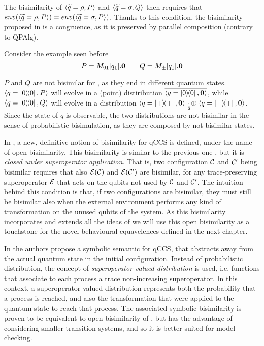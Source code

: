 The bisimilarity of $\langle\widetilde{q} = \rho, P\rangle $ and $\langle\widetilde{q} = 	\sigma, Q\rangle$ then requires that 
$env(\langle\widetilde{q} = \rho, P\rangle) = env(\langle\widetilde{q} = \sigma, P\rangle)$. Thanks to this condition, the bisimilarity proposed in \cite{fengBisimulationQuantumProcesses2012} is a congruence, as it is preserved by parallel composition (contrary to QPAlg).


Consider the example seen before 
\[P = M_{01}[q_1].\mathbf{0} \qquad Q = M_\pm[q_1].\mathbf{0} \]

$P$ and $Q$ are not bisimilar for \cite{fengProbabilisticBisimulationsQuantum2007, fengBisimulationQuantumProcesses2012, dengOpenBisimulationQuantum2012} , as they end in different quantum states. $\langle q = \ket{0}\!\!\bra{0}, P\rangle$ will evolve in a (point) distiribution $\overline{\langle q = \ket{0}\!\!\bra{0}, \mathbf{0}\rangle}$, while $\langle q = \ket{0}\!\!\bra{0}, Q\rangle$ will evolve in a distribution $\confw{q = \proj{+}, \nil} \psum{\frac{1}{2}} \confw{q = \proj{+}, \nil}$. Since the state of $q$ is observable, the two distributions are not bisimilar in the sense of probabilistic bisimulation, as they are composed by not-bisimilar states.

In \cite{dengOpenBisimulationQuantum2012}, a new, definitive notion of bisimilarity for qCCS is defined, under the name of open bisimilarity. This bisimilarity is similar to the previous one \cite{fengBisimulationQuantumProcesses2012}, but it is \textit{closed under superoperator application}. That is, two configuration $\mathcal{C}$ and $\mathcal{C}'$ being bisimilar requires that also $\mathcal{E}(\mathcal{C})$ and $\mathcal{E}(\mathcal{C}')$ are bisimilar, for any trace-preserving superoperator $\mathcal{E}$ that acts on the qubits not used by $\mathcal{C}$ and $\mathcal{C}'$. The intuition behind this condition is that, if two configurations are bisimilar, they must still be bisimilar also when the external environment performs any kind of transformation on the unused qubits of the system. As this bisimilarity incorporates and extends all the ideas of \cite{fengBisimulationQuantumProcesses2012, yingAlgebraQuantumProcesses2010, fengBisimulationQuantumProcesses2012} we will use this open bisimilarity as a touchstone for the novel behavioural equavelences defined in the next chapter.


In \cite{fengSymbolicBisimulationQuantum2014} the authors propose a symbolic semantic for qCCS, that abstracts away from the actual quantum state in the initial configuration. Instead of probabilistic distribution, the concept of \textit{superoperator-valued distribution} is used, i.e. functions that associate to each process a trace non-increasing superoperator. In this context, a superoperator valued distribution represents both the probability that a process is reached, and also the transformation that were applied to the quantum state to reach that process. The associated symbolic bisimilarity is proven to be equivalent to open bisimilarity of \cite{dengOpenBisimulationQuantum2012}, but has the advantage of considering smaller transition systems, and so it is better suited for model checking.  


